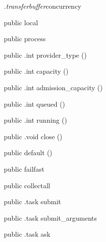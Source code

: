 \begin{CrexxClass}{\textit{.transferbuffer}}{concurrency}

  \begin{Hierarchy}
  \end{Hierarchy}

  \begin{Members}

    \Factory
      {public}
      {local}
      {}

    \Factory
      {public}
      {process}
      {}

    \Method
      {public}
      {.int}
      {provider\_type}
      {()}

    \Method
      {public}
      {.int}
      {capacity}
      {()}

    \Method
      {public}
      {.int}
      {admission\_capacity}
      {()}

    \Method
      {public}
      {.int}
      {queued}
      {()}

    \Method
      {public}
      {.int}
      {running}
      {()}

    \Method
      {public}
      {.void}
      {close}
      {()}

    \Factory
      {public}
      {default}
      {()}

    \Factory
      {public}
      {failfast}
      {}

    \Factory
      {public}
      {collectall}
      {}

    \Method
      {public}
      {.task}
      {submit}
      {}

    \Method
      {public}
      {.task}
      {submit\_arguments}
      {}

    \Method
      {public}
      {.task}
      {ask}
      {}


\end{Members}
\end{CrexxClass}
